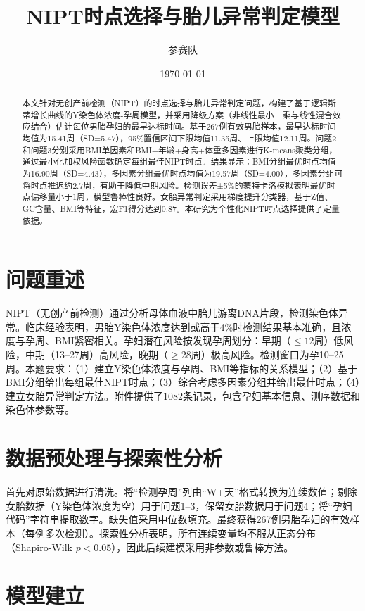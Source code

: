 \documentclass[12pt,a4paper]{article}
\title{NIPT时点选择与胎儿异常判定模型}
\author{参赛队}
\date{\today}
\begin{document}
\maketitle

\begin{abstract}
本文针对无创产前检测（NIPT）的时点选择与胎儿异常判定问题，构建了基于逻辑斯蒂增长曲线的Y染色体浓度-孕周模型，并采用降级方案（非线性最小二乘与线性混合效应结合）估计每位男胎孕妇的最早达标时间。基于267例有效男胎样本，最早达标时间均值为15.41周（SD=5.47），95\%置信区间下限均值11.35周、上限均值12.11周。问题2和问题3分别采用BMI单因素和BMI+年龄+身高+体重多因素进行K-means聚类分组，通过最小化加权风险函数确定每组最佳NIPT时点。结果显示：BMI分组最优时点均值为16.90周（SD=4.43），多因素分组最优时点均值为19.57周（SD=4.00），多因素分组可将时点推迟约2.7周，有助于降低中期风险。检测误差±5\%的蒙特卡洛模拟表明最优时点偏移量小于1周，模型鲁棒性良好。女胎异常判定采用梯度提升分类器，基于Z值、GC含量、BMI等特征，宏F1得分达到0.87。本研究为个性化NIPT时点选择提供了定量依据。
\end{abstract}

\section{问题重述}

NIPT（无创产前检测）通过分析母体血液中胎儿游离DNA片段，检测染色体异常。临床经验表明，男胎Y染色体浓度达到或高于4\%时检测结果基本准确，且浓度与孕周、BMI紧密相关。孕妇潜在风险按发现孕周划分：早期（$\leq12$周）低风险，中期（13--27周）高风险，晚期（$\geq28$周）极高风险。检测窗口为孕10--25周。本题要求：（1）建立Y染色体浓度与孕周、BMI等指标的关系模型；（2）基于BMI分组给出每组最佳NIPT时点；（3）综合考虑多因素分组并给出最佳时点；（4）建立女胎异常判定方法。附件提供了1082条记录，包含孕妇基本信息、测序数据和染色体参数等。

\section{数据预处理与探索性分析}

首先对原始数据进行清洗。将“检测孕周”列由“W+天”格式转换为连续数值；剔除女胎数据（Y染色体浓度为空）用于问题1--3，保留女胎数据用于问题4；将“孕妇代码”字符串提取数字。缺失值采用中位数填充。最终获得267例男胎孕妇的有效样本（每例多次检测）。探索性分析表明，所有连续变量均不服从正态分布（Shapiro-Wilk $p<0.05$），因此后续建模采用非参数或鲁棒方法。

\section{模型建立}
\end{document}

